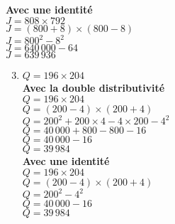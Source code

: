 \begin{corrige}
\begin{enumerate}
{            \medskip
            \textbf{Avec une identité}\\
            $J = 808\times 792$\\
            $J = (800 + 8)\times (800 - 8) $\\
            $J = 800^2  -  8^2$\\
            $J = 640\,000  -  64$\\                        
            $J = 639\,936$\\
        }
    \end{enumerate}
    \Coupe
    \begin{enumerate}
        \setcounter{enumi}{2}
        \item $Q=196\times 204$\\
        {\red
            \textbf{Avec la double distributivité}\\
            $Q = 196\times 204$\\
            $Q = (200 - 4)\times (200 + 4)$\\
            $Q = 200^2 + 200\times 4 - 4\times 200 - 4^2$\\
            $Q = 40\,000 + 800 - 800   - 16$\\
            $Q = 40\,000  - 16$\\
            $Q = 39\,984$\\

            \medskip
            \textbf{Avec une identité}\\
            $Q = 196\times 204$\\
            $Q = (200 - 4)\times (200 + 4) $\\
            $Q = 200^2  -  4^2$\\
            $Q = 40\,000  -  16$\\                        
            $Q = 39\,984$\\
        }
    \end{enumerate}
\end{corrige}


